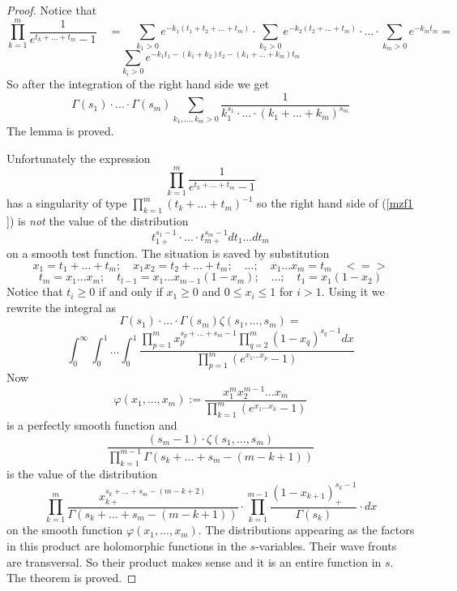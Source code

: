 \documentclass[10pt]{article}
\begin{document}
\begin{proof} Notice that
$$
\prod_{k=1}^{m}\frac{1}{e^{t_k+...+t_m}-1} \quad = \quad \sum_{k_1  >0}e^{-k_1(t_1+t_2+...+t_m)}\cdot \sum_{k_2>0}e^{-k_2(t_2 +...+t_m)} \cdot ... \cdot  
\sum_{k_m>0}e^{-k_mt_m} = 
$$
$$
\sum_{k_i  >0}e^{-k_1t_1 - (k_1+k_2)t_2 - (k_1+...+k_m)t_m}
$$
 So after the integration of the   right hand side   we get
$$
\Gamma(s_1) \cdot ... \cdot\Gamma(s_m)\sum_{k_1,...,k_m >0} \frac{1}{k_1^{s_1}\cdot ... \cdot (k_1+...+k_m)^{s_m}} 
$$
The lemma is proved.

Unfortunately the expression
$$
\prod_{k=1}^{m}\frac{1}{e^{t_k+...+t_m}-1}
$$ 
has a singularity of type 
$
\prod_{k=1}^{m}( t_k+...+t_m )^{-1} 
$ 
so the right hand side  of (\ref{mzf1 })  is {\it not} the value of  the  distribution 
\begin{equation} \label{maindistrib1}
{t_{1+}^{s_1-1}} \cdot ... \cdot {t_{m+}^{s_m-1}}  dt_1...dt_m
\end{equation} 
 on a smooth test function.
 The situation is saved by   substitution 
$$
x_1 = t_1 + ... + t_m; \quad x_1x_2 = t_2 + ... + t_m; \quad ...; \quad x_1 ... x_m =  t_m \quad <=>
$$
$$
t_m = x_1 ... x_m; \quad t_{l-1} = x_1 ... x_{m-1}(1-x_m); \quad ... ;\quad  t_1 = x_1(1-x_2)
$$
Notice that
$t_i \geq 0 $  if and only if  $ x_1 \geq 0$ and  $ 0 \leq x_i \leq  1$  for $i>1$. 
Using it we rewrite the integral as
$$
\Gamma(s_1)\cdot ... \cdot \Gamma(s_m)\zeta(s_1,...,s_m) = 
$$
$$
\int_0^{\infty}\int_0^{1}...\int_0^{1} 
\frac{     \prod_{p=1}^m x_p^{s_p+ ... + s_m -1} \prod_{q=2}^m (1-x_q)^{s_q-1} dx}
{\prod_{p=1}^m (e^{x_1 ... x_p  }-1)}
$$
 Now
$$
\varphi(x_1,...,x_m):= \frac{ x_1^mx_2^{m-1}...x_m}{\prod_{k=1}^{m} (e^{x_1 ... x_k }-1)}
$$
is a perfectly smooth function and 
$$
  \frac{(s_m-1)\cdot\zeta(s_1,...,s_m)}{\prod_{k=1}^{m-1}\Gamma(s_k + ... + s_m-(m-k+1)) }  
$$
is the value of the distribution
\begin{equation} \label{maindistrib}
 \prod_{k=1}^{m}\frac{x_{k+}^{s_k+...+s_m-(m-k+2)}}{\Gamma(s_k + ... +s_m-(m-k+1)) }    \cdot
\prod_{k=1}^{m-1}\frac{(1-x_{k+1})_+^{s_{k}-1}  }{\Gamma(s_k)} \cdot dx 
\end{equation} 
on the smooth  function $\varphi(x_1,...,x_m)$. 
The distributions appearing as the factors in this product 
are holomorphic functions in the $s$-variables. Their wave fronts are transversal.  
So their product makes sense and it is  an entire function in $s$. The theorem is proved.


\end{proof}
\end{document}
